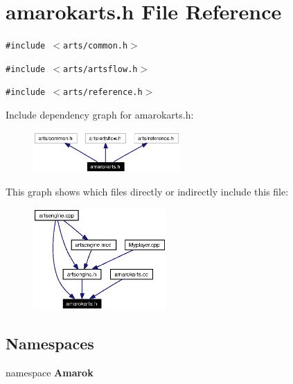 \section{amarokarts.h File Reference}
\label{amarokarts_8h}


{\tt \#include $<$arts/common.h$>$}\par
{\tt \#include $<$arts/artsflow.h$>$}\par
{\tt \#include $<$arts/reference.h$>$}\par


Include dependency graph for amarokarts.h:\begin{figure}[H]
\begin{center}
\leavevmode
\includegraphics[width=159pt]{amarokarts_8h__incl}
\end{center}
\end{figure}


This graph shows which files directly or indirectly include this file:\begin{figure}[H]
\begin{center}
\leavevmode
\includegraphics[width=144pt]{amarokarts_8h__dep__incl}
\end{center}
\end{figure}
\subsection*{Namespaces}
\begin{CompactItemize}
\item 
namespace {\bf Amarok}
\end{CompactItemize}
